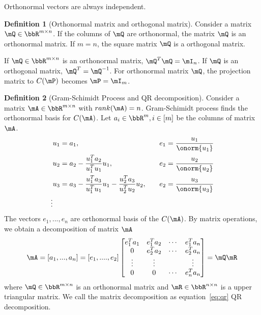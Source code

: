 \documentclass[11pt]{article}
\theoremstyle{plain}
\theoremstyle{definition}
\newtheorem{defn}{Definition}
\begin{document}
Orthonormal vectors are always independent.

\begin{defn}[Orthonormal matrix and orthogonal matrix]\label{def:orthonom}
	Consider a matrix $\mQ \in \bbR^{m \times n}$. If the columns of $\mQ$ are orthonormal, the matrix $\mQ$ is an orthonormal matrix. If $ m= n$, the square matrix $\mQ$ is a orthogonal matrix.
\end{defn}

If $\mQ \in \bbR^{m \times n}$ is an orthonormal matrix, $\mQ^T \mQ = \mI_n$.  If $\mQ$ is an orthogonal matrix, $\mQ^T = \mQ^{-1}$.
For orthonormal matrix $\mQ$, the projection matrix to $C(\mP)$  becomes $\mP = \mI_m$.

\begin{defn}[Gram-Schimidt Process and QR decomposition]\label{gram-schimidt}
Consider a matrix $\mA \in \bbR^{m \times n}$ with $rank(\mA) = n$. Gram-Schimidt process finds the orthonormal basis for $C(\mA)$. Let $a_i \in \bbR^{m}, i \in [m]$ be the columns of matrix $\mA$. 
\begin{align}
	&u_1 = a_1, &&\quad e_1 = \frac{u_1}{\onorm{u_1}}\\
	&u_2 = a_2 - \frac{u_1^T a_2}{u_1^T u_1} u_1 ,&&\quad  e_2 = \frac{u_2}{\onorm{u_2}}\\
	&u_3 = a_3 - \frac{u_1^T a_3}{u_1^T u_1} u_1 - \frac{u_2^T a_3}{u_2^T u_2} u_2,&&\quad  e_2 = \frac{u_3}{\onorm{u_3}}\\
	\vdots
\end{align}
 The vectors $e_1,...,e_n$ are orthonormal basis of the $C(\mA)$. By matrix operations, we obtain a decomposition of matrix $\mA$
 \begin{equation}\label{eq:qr}
 	\mA = [a_1,...,a_n] = [e_1,....,e_2] \begin{bmatrix}
 		e_1^T a_1 & e_1^T a_2 & \cdots & e_1^T a_n\\
 		0&e_2^T a_2 & \cdots & e_2^T a_n\\
 		\vdots &\vdots & & \vdots \\
 		0 &0&\cdots & e_n^T a_n
 	\end{bmatrix} = \mQ \mR
 \end{equation}
	where $\mQ \in \bbR^{m \times n}$ is an orthonormal matrix and $\mR \in \bbR^{n \times n}$ is a upper triangular matrix. We call the matrix decomposition as equation~\eqref{eq:qr} QR decomposition.
\end{defn}
\end{document}
